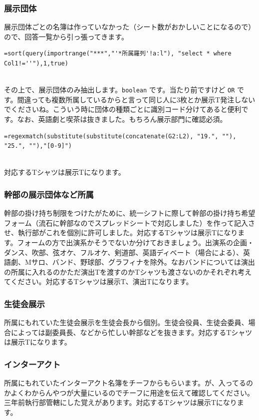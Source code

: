 \documentclass[dvipdfmx,jb5]{jreport}
\begin{document}
\subsubsection{展示団体}
展示団体ごとの名簿は作っていなかった（シート数がおかしいことになるので）ので、回答一覧から引っ張ってきます。
\\
\begin{lstlisting}
=sort(query(importrange("***","'*所属羅列'!a:l"), "select * where Col1!=''"),1,true)
\end{lstlisting}
\\
その上で、展示団体のみ抽出します。\texttt{boolean} です。当たり前ですけど \texttt{OR} です。間違っても複数所属しているからと言って同じ人に3枚とか展示T発注しないでくださいね。こういう時に団体の種類ごとに識別コード分けてあると便利です。なお、英語劇と喫茶は抜きました。もちろん展示部門に確認必須。
\\
\begin{lstlisting}
=regexmatch(substitute(substitute(concatenate(G2:L2), "19.", ""), "25.", ""),"[0-9]")
\end{lstlisting}
\\
対応するTシャツは展示Tになります。

\subsubsection{幹部の展示団体など所属}
幹部の掛け持ち制限をつけたがために、統一シフトに際して幹部の掛け持ち希望フォーム（流石に幹部なのでスプレッドシートで対応しました）を作って記入させ、執行部がこれを個別に許可しました。対応するTシャツは展示Tになります。フォームの方で出演系かそうでないか分けておきましょう。出演系の企画・ダンス、吹部、弦オケ、フルオケ、剣道部、英語ディベート（場合による）、英語劇、Mサロ、バンド、野球部、グラフィナを除外。なおバンドについては演出の所属に入れるのかただ演出Tを渡すのかTシャツも渡さないのかそれぞれ考えてください。対応するTシャツは展示T、演出Tになります。

\subsubsection{生徒会展示}
所属にもれていた生徒会展示を生徒会長から個別。生徒会役員、生徒会委員、場合によっては副委員長、などから忙しい幹部などを抜きます。対応するTシャツは展示Tになります。

\subsubsection{インターアクト}
所属にもれていたインターアクト名簿をチーフからもらいます。が、入ってるのかよくわからんやつが大量にいるのでチーフに用途を伝えて確認してください。三年前執行部管轄にした覚えがあります。対応するTシャツは展示Tになります。
\end{document}
